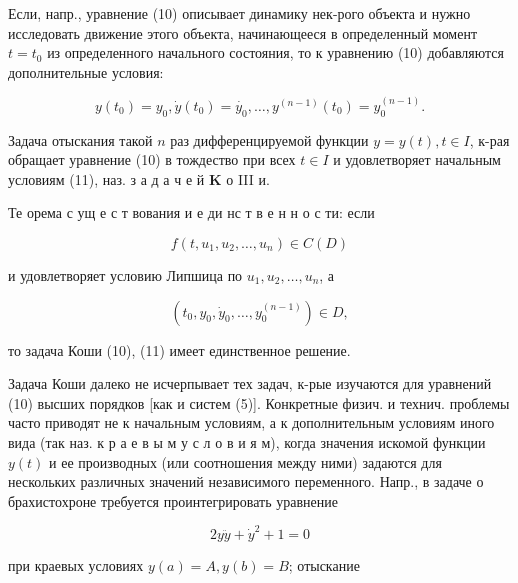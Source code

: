 \documentclass[10pt]{article}
\begin{document}
Если, напр., уравнение (10) описывает динамику нек-рого объекта и нужно исследовать движение этого объекта, начинающееся в определенный момент $t=t_{0}$ из определенного начального состояния, то к уравнению (10) добавляются дополнительные условия:



\[

y\left(t_{0}\right)=y_{0}, \dot{y}\left(t_{0}\right)=\dot{y_{0}}, \ldots, y^{(n-1)}\left(t_{0}\right)=y_{0}^{(n-1)} .

\]



Задача отыскания такой $n$ раз дифференцируемой функции $y=y(t), t \in I$, к-рая обращает уравнение (10) в тождество при всех $t \in I$ и удовлетворяет начальным условиям (11), наз. з а д а ч е й $\mathbf{K}$ о III и.



Те орема с ущ е с т вования и е ди нс т в е н н о с ти: если



\[

f\left(t, u_{1}, u_{2}, \ldots, u_{n}\right) \in C(D)

\]



и удовлетворяет условию Липшица по $u_{1}, u_{2}, \ldots, u_{n}$, а



\[

\left(t_{0}, y_{0}, \dot{y}_{0}, \ldots, y_{0}^{(n-1)}\right) \in D,

\]



то задача Коши (10), (11) имеет единственное решение.



Задача Коши далеко не исчерпывает тех задач, к-рые изучаются для уравнений (10) высших порядков [как и систем (5)]. Конкретные физич. и технич. проблемы часто приводят не к начальным условиям, а к дополнительным условиям иного вида (так наз. к р а е в ы м у с л о в и я м), когда значения искомой функции $y(t)$ и ее производных (или соотношения между ними) задаются для нескольких различных значений независимого переменного. Напр., в задаче о брахистохроне требуется проинтегрировать уравнение



\[

2 y \ddot{y}+\dot{y}^{2}+1=0

\]



при краевых условиях $y(a)=A, y(b)=B$; отыскание
\end{document}

